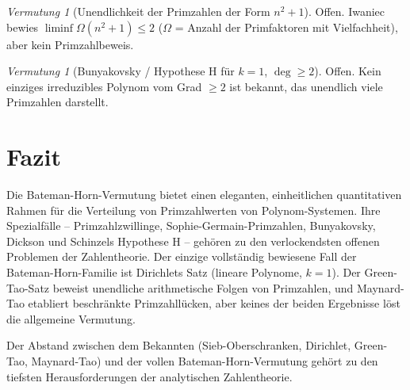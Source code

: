 \documentclass[12pt,a4paper]{amsart}
\theoremstyle{definition}
\theoremstyle{remark}
\newtheorem{vermutung}[theorem]{Vermutung}
\begin{document}
\begin{vermutung}[Unendlichkeit der Primzahlen der Form $n^2+1$]
  Offen. Iwaniec \cite{Iwaniec1978} bewies $\liminf \Omega(n^2+1) \leq 2$
  ($\Omega$ = Anzahl der Primfaktoren mit Vielfachheit), aber kein Primzahlbeweis.
\end{vermutung}

\begin{vermutung}[Bunyakovsky / Hypothese H für $k=1$, $\deg \geq 2$]
  Offen. Kein einziges irreduzibles Polynom vom Grad $\geq 2$ ist bekannt, das unendlich
  viele Primzahlen darstellt.
\end{vermutung}

\section{Fazit}\label{sec:fazit}

Die Bateman-Horn-Vermutung bietet einen eleganten, einheitlichen quantitativen Rahmen
für die Verteilung von Primzahlwerten von Polynom-Systemen.
Ihre Spezialfälle -- Primzahlzwillinge, Sophie-Germain-Primzahlen, Bunyakovsky,
Dickson und Schinzels Hypothese H -- gehören zu den verlockendsten offenen Problemen
der Zahlentheorie.
Der einzige vollständig bewiesene Fall der Bateman-Horn-Familie ist Dirichlets Satz
(lineare Polynome, $k=1$). Der Green-Tao-Satz beweist unendliche arithmetische
Folgen von Primzahlen, und Maynard-Tao etabliert beschränkte Primzahllücken, aber
keines der beiden Ergebnisse löst die allgemeine Vermutung.

Der Abstand zwischen dem Bekannten (Sieb-Oberschranken, Dirichlet, Green-Tao,
Maynard-Tao) und der vollen Bateman-Horn-Vermutung gehört zu den tiefsten
Herausforderungen der analytischen Zahlentheorie.
\end{document}
